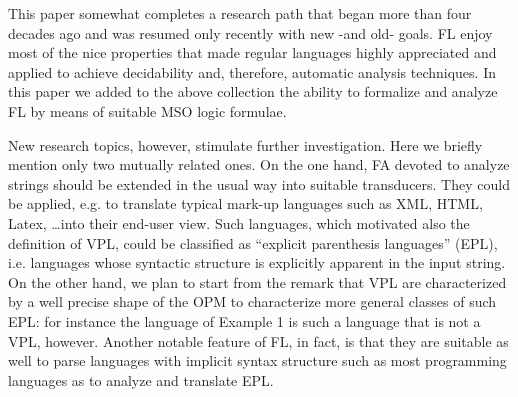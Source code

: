 \documentclass[10pt,a4paper,runningheads]{llncs}
\begin{document}
This paper somewhat completes a research path that began more than
four decades ago and was resumed only recently with new -and old-
goals. FL enjoy most of the nice properties that made regular
languages highly appreciated and applied to achieve decidability and,
therefore, automatic analysis techniques. In this paper we added to
the above collection the ability to formalize and analyze FL by means
of suitable MSO logic formulae. 

 New research topics, however,
stimulate further investigation. Here we briefly mention only two
mutually related ones. On the one hand, FA devoted to analyze strings should be
extended in the usual way into suitable transducers. They could be
applied, e.g. to translate typical mark-up languages such as XML,
HTML, Latex, \ldots into their end-user view. Such languages, which
motivated also the definition of VPL, could be classified as
``explicit parenthesis languages'' (EPL), i.e. languages whose
syntactic structure is explicitly apparent in the input string. On the
other hand, we
plan to start from the remark that VPL are characterized by a well
precise shape of the OPM \cite{Crespi-ReghizziM12} to characterize
more general classes of such EPL: for instance the language of Example
1 is such a language that is not a VPL, however. Another notable
feature of FL, in fact, is that they are suitable as well to parse
languages with implicit syntax structure such as most programming
languages as to analyze and translate EPL.












\end{document}

